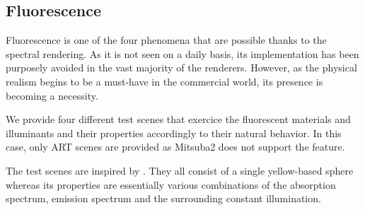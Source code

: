\subsection{Fluorescence}

Fluorescence is one of the four phenomena that are possible thanks to the spectral rendering. As it is not seen on a daily basis, its implementation has been purposely avoided in the vast majority of the renderers. However, as the physical realism begins to be a must-have in the commercial world, its presence is becoming a necessity.

We provide four different test scenes that exercice the fluorescent materials and illuminants and their properties accordingly to their natural behavior. In this case, only ART scenes are provided as Mitsuba2 does not support the feature. 

The test scenes are inspired by \citet{mojzik2018handling}. They all consist of a single yellow-based sphere whereas its properties are essentially various combinations of the absorption spectrum, emission spectrum and the surrounding constant illumination.


